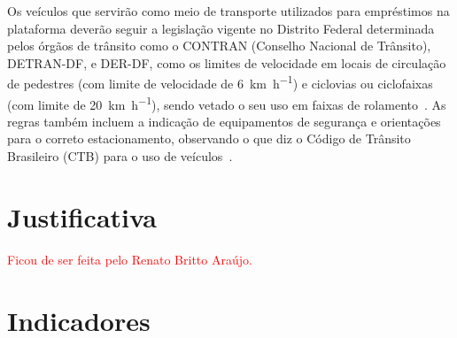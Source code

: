 Os veículos que servirão como meio de transporte utilizados para empréstimos na plataforma deverão seguir a legislação vigente no Distrito Federal determinada pelos órgãos de trânsito como o CONTRAN (Conselho Nacional de Trânsito),  DETRAN-DF, e DER-DF, como os limites de velocidade em locais de circulação de pedestres (com limite de velocidade de \SI{6}{\km\per\hour}) e ciclovias ou ciclofaixas (com limite de \SI{20}{\km\per\hour}), sendo vetado o seu uso em faixas de rolamento~\cite{detran2019}. As regras também incluem a indicação de equipamentos de segurança e orientações para o correto estacionamento, observando o que diz o Código de Trânsito Brasileiro (CTB) para o uso de veículos~\cite{CTB}.


\section{Justificativa}

\textcolor{red}{Ficou de ser feita pelo Renato Britto Araújo.}


\section{Indicadores}

